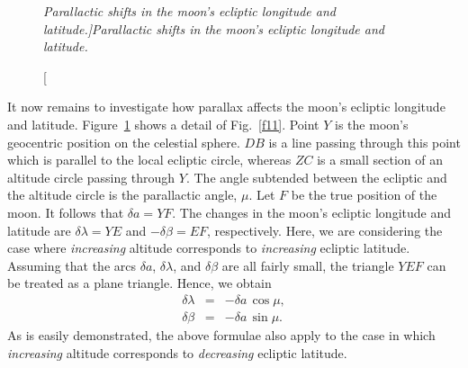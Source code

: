 \begin{figure}
\epsfysize=3in
\centerline{}
\caption[\em Parallactic shifts in the moon's ecliptic longitude and latitude.]{\em Parallactic shifts in the moon's ecliptic longitude and latitude.}\label{fpara1}
\end{figure}

It now remains to investigate how parallax affects the moon's ecliptic
longitude and latitude. Figure~\ref{fpara1} shows a detail of Fig.~\ref{f11}. Point $Y$ is the moon's geocentric position on the celestial sphere. $DB$ is a line passing through this point
which is parallel to the local ecliptic circle, whereas $ZC$ is a small section of an
altitude circle passing through $Y$. The angle subtended between the ecliptic and the altitude circle is the parallactic angle, $\mu$. Let $F$ be the true position of the moon.
It follows that $\delta a = YF$. The changes in the moon's ecliptic longitude
and latitude are $\delta\lambda = YE$ and  $-\delta\beta = EF$, respectively. Here, we are considering the case where  {\em increasing}\/
altitude corresponds to {\em increasing}\/ ecliptic latitude.
Assuming that the arcs $\delta a$, $\delta\lambda$, and $\delta\beta$ are
all fairly small, the triangle $YEF$ can be treated as a plane triangle.
Hence, we obtain
\begin{eqnarray}\label{epara1}
\delta\lambda &=& - \delta a\,\cos\mu,\\[0.5ex]
\delta\beta &=& - \delta a\,\sin\mu.\label{epara2}
\end{eqnarray}
As is easily demonstrated, the above formulae also apply to the case in which {\em increasing}\/ altitude corresponds
to {\em decreasing}\/ ecliptic latitude.

